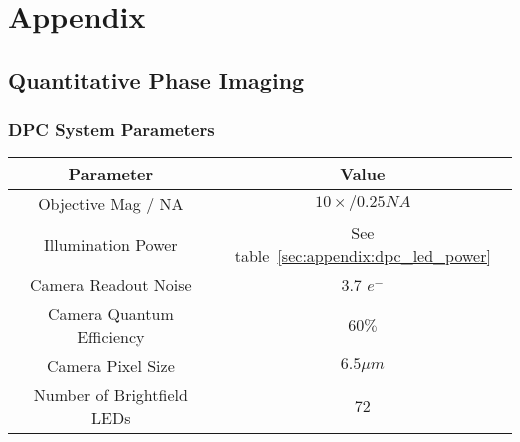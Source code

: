 \chapter{Appendix} \label{ch:appendix}


\section{Quantitative Phase Imaging}\label{sec:appendix:phase}

\subsection{DPC System Parameters}\label{sec:appendix:dpc_sys_param}
\begin{center}
    \begin{tabular}{ | c | c |}
    \hline
    \textbf{Parameter} & \textbf{Value} \\
    \hline
    Objective Mag / NA& $10\times / 0.25NA$\\
    \hline
    Illumination Power & See table~\ref{sec:appendix:dpc_led_power}\\
    \hline
    Camera Readout Noise & 3.7 $e^-$ \\
    \hline
    Camera Quantum Efficiency & $60\%$ \\
    \hline
    Camera Pixel Size & $6.5\mu m$\\
    \hline
    Number of Brightfield LEDs & $72$\\
    \hline
    \end{tabular}
\end{center}

